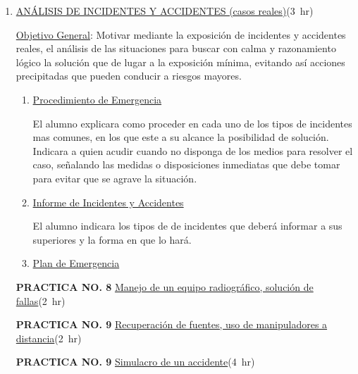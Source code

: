 \documentclass[11pt, oneside]{book}
\begin{document}
\begin{enumerate}
\begin{enumerate}[label*=\arabic*.]
      \item \ul{Obligaciones del Encargado de Seguridad Radiol\'ogica.}

        El alumno describirá las funciones mas importantes del Encargado de Seguridad Radiológica.

      \item \ul{La C.N.S.N.S. sus Funciones y Organizaci\'on.}

        El alumno explicara cuales son las funciones y las dependencias
        de la C.N.S.N.S. relacionadas con su área de trabajo, así como la
        forma de acceso a esas dependencias cuando requiera de orientación
        o auxilio en caso de incidentes o accidentes radiológicos.

    \end{enumerate}

  \item \ul{AN\'ALISIS DE INCIDENTES Y ACCIDENTES (casos reales)}\hfill\mbox{(3 hr)}

    \ul{Objetivo General}: Motivar mediante la exposición de incidentes
    y accidentes reales, el análisis de las situaciones para buscar con
    calma y razonamiento lógico la solución que de lugar a la exposición
    mínima, evitando así acciones precipitadas que pueden conducir a riesgos
    mayores.

    \begin{enumerate}[label*=\arabic*.]
      \item \ul{Procedimiento de Emergencia}

        El alumno explicara como proceder en cada uno de
        los tipos de incidentes mas comunes, en los que
        este a su alcance la posibilidad de solución.
        Indicara a quien acudir cuando no disponga de los medios para
        resolver el caso, señalando las medidas o disposiciones
        inmediatas que debe tomar para evitar que se agrave la situación.

      \item \ul{Informe de Incidentes y Accidentes}

        El alumno indicara los tipos de de incidentes que deberá informar a sus superiores y la forma en que lo hará.

      \item \ul{Plan de Emergencia}

    \end{enumerate}
    \textbf{PRACTICA NO. 8} \ul{Manejo de un equipo radiogr\'afico, soluci\'on de fallas}\hfill\mbox{(2 hr)}

    \textbf{PRACTICA NO. 9} \ul{Recuperaci\'on de fuentes, uso de manipuladores a distancia}\hfill\mbox{(2 hr)}

    \textbf{PRACTICA NO. 9} \ul{Simulacro de un accidente}\hfill\mbox{(4 hr)}
\end{enumerate}
\end{document}

